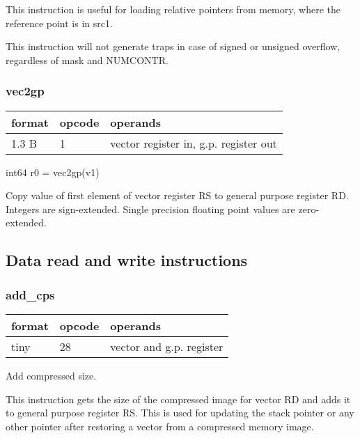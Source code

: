 \documentclass[forwardcom.tex]{subfiles}
\begin{document}
This instruction is useful for loading relative pointers from memory, where the reference
point is in src1.
\vspace{2mm}

This instruction will not generate traps in case of signed or unsigned overflow, regardless of mask and  NUMCONTR.
\vspace{2mm}


\subsubsection{vec2gp}
\label{table:vec2gpInstruction}
\begin{tabular}{|p{12mm}|p{12mm}|p{110mm}|}
\hline
\bfseries format & \bfseries opcode & \bfseries operands \\ \hline
1.3 B & 1 & vector register in, g.p. register out \\ \hline
\end{tabular}
\vspace{2mm}

int64 r0 = vec2gp(v1)
\vspace{2mm}

Copy value of first element of vector register RS to general purpose register RD. Integers are sign-extended. Single precision floating point values are zero-extended.

\vspace{2mm}
\subsection{Data read and write instructions}

\subsubsection{add\_cps}
\label{table:addCpsInstruction}
\begin{tabular}{|p{12mm}|p{12mm}|p{110mm}|}
\hline
\bfseries format & \bfseries opcode & \bfseries operands \\ \hline
tiny & 28 & vector and g.p. register \\ \hline
\end{tabular}
\vspace{2mm}

Add compressed size.
\vspace{2mm}

This instruction gets the size of the compressed image for vector RD and adds it to general purpose register RS.
This is used for updating the stack pointer or any other pointer
after restoring a vector from a compressed memory image.
\vspace{2mm}
\end{document}
